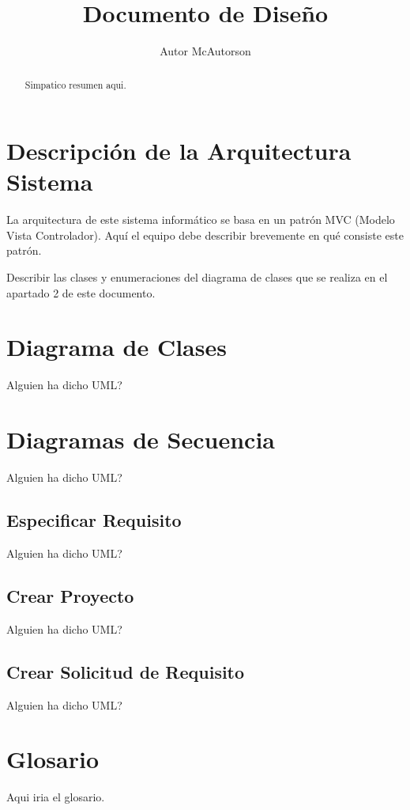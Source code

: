 \documentclass[a4paper, spanish]{article}
\title{Documento de Diseño}
\author{Autor McAutorson}
\begin{document}
\maketitle
\begin{abstract}
Simpatico resumen aqui.
\end{abstract}
\vspace{\fill}
\tableofcontents
\let\oldsection\section\renewcommand\section{\clearpage\oldsection}

\section{Descripción de la Arquitectura Sistema}
La arquitectura de este sistema informático se basa en un patrón MVC (Modelo Vista Controlador). Aquí el equipo debe describir brevemente en qué consiste este patrón.
 
Describir las clases y enumeraciones del diagrama de clases que se realiza en el apartado 2 de este documento.

\section{Diagrama de Clases}
Alguien ha dicho UML?

\section{Diagramas de Secuencia}
Alguien ha dicho UML?

\subsection{Especificar Requisito} %
Alguien ha dicho UML?
\subsection{Crear Proyecto} %
Alguien ha dicho UML?
\subsection{Crear Solicitud de Requisito} %
Alguien ha dicho UML?

\section{Glosario}
Aqui iria el glosario.
\end{document}
